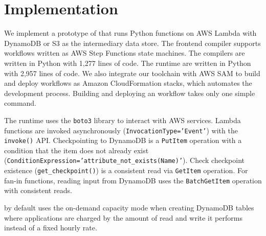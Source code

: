 \section{Implementation}\label{sec:impl}

We implement a prototype of \name{} that runs Python functions on AWS Lambda
with DynamoDB or S3 as the intermediary data store. The frontend compiler
supports workflows written as AWS Step Functions state machines. The compilers
are written in Python with 1,277 lines of code. The runtime are written in
Python with 2,957 lines of code. We also integrate our toolchain with AWS SAM
to build and deploy \name{} workflows as Amazon CloudFormation stacks, which
automates the development process. Building and deploying an \name{} workflow
takes only one simple command.

The runtime uses the \texttt{boto3} library to interact with AWS services.
Lambda functions are invoked asynchronously (\texttt{InvocationType='Event'})
with the \texttt{invoke()} API. Checkpointing to DynamoDB is a
\texttt{PutItem} operation with a condition that the item does not already
exist (\texttt{ConditionExpression='attribute\_not\_exists(Name)'}). Check
checkpoint existence (\texttt{get\_checkpoint()}) is a consistent read via
\texttt{GetItem} operation. For fan-in functions, reading input from DynamoDB
uses the \texttt{BatchGetItem} operation with consistent reads.

\name{} by default uses the on-demand capacity mode when creating DynamoDB
tables where applications are charged by the amount of read and write it
performs instead of a fixed hourly rate.

